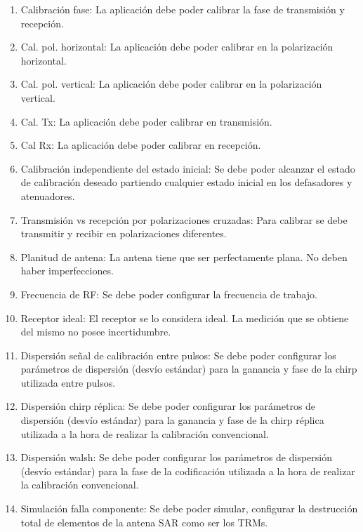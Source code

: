 \begin{enumerate}
    \item Calibración fase: La aplicación debe poder calibrar la fase de transmisión y recepción.
    
    \item Cal. pol. horizontal: La aplicación debe poder calibrar en la polarización horizontal. 
    \item Cal. pol. vertical: La aplicación debe poder calibrar en la polarización vertical. 
    \item Cal. Tx: La aplicación debe poder calibrar en transmisión. 
    \item Cal Rx: La aplicación debe poder calibrar en recepción. 
    
    \item Calibración independiente del estado inicial: Se debe poder alcanzar el estado de calibración deseado partiendo 
		cualquier estado inicial en los defasadores y atenuadores.
    
    \item Transmisión vs recepción por polarizaciones cruzadas: Para calibrar se debe transmitir y recibir en polarizaciones 
		diferentes.
    
    \item Planitud de antena: La antena tiene que ser perfectamente plana. No deben haber imperfecciones.
           
    \item Frecuencia de RF: Se debe poder configurar la frecuencia de trabajo.
	
	\item Receptor ideal: El receptor se lo considera ideal. La medición que se obtiene del mismo no posee incertidumbre.

    \item Dispersión señal de calibración entre pulsos: Se debe poder configurar los parámetros de dispersión (desvío estándar) para 
		la ganancia y fase de la chirp utilizada entre pulsos.

    \item Dispersión chirp réplica: Se debe poder configurar los parámetros de dispersión (desvío estándar) para la 
		ganancia y fase de la chirp réplica utilizada a la hora de realizar la calibración convencional.
    
    \item Dispersión walsh: Se debe poder configurar los parámetros de dispersión (desvío estándar) para la fase de la 
		codificación utilizada a la hora de realizar la calibración convencional.

    \item Simulación falla componente: Se debe poder simular, configurar la destrucción total de elementos de la antena SAR 
		como ser los TRMs.
\end{enumerate}


